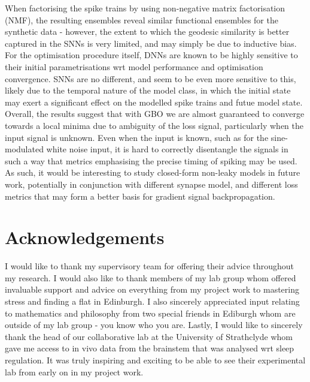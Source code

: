 \documentclass[mphil,deptreport,ai]{infthesis} %
\begin{document}
\begin{preliminary}
{    When factorising the spike trains by using non-negative matrix factorisation (NMF), the resulting ensembles reveal similar functional ensembles for the synthetic data - however, the extent to which the geodesic similarity is better captured in the SNNs is very limited, and may simply be due to inductive bias.
    For the optimisation procedure itself, DNNs are known to be highly sensitive to their initial parametrisations wrt model performance and optimisation convergence.
    SNNs are no different, and seem to be even more sensitive to this, likely due to the temporal nature of the model class, in which the initial state may exert a significant effect on the modelled spike trains and futue model state.
    Overall, the results suggest that with GBO we are almost guaranteed to converge towards a local minima due to ambiguity of the loss signal, particularly when the input signal is unknown.
    Even when the input is known, such as for the sine-modulated white noise input, it is hard to correctly disentangle the signals in such a way that metrics emphasising the precise timing of spiking may be used.
    As such, it would be interesting to study closed-form non-leaky models in future work, potentially in conjunction with different synapse model, and different loss metrics that may form a better basis for gradient signal backpropagation.
}

\maketitle

\section*{Acknowledgements}

I would like to thank my supervisory team for offering their advice throughout my research.
I would also like to thank members of my lab group whom offered invaluable support and advice on everything from my project work to mastering stress and finding a flat in Edinburgh.
I also sincerely appreciated input relating to mathematics and philosophy from two special friends in Ediburgh whom are outside of my lab group - you know who you are.
Lastly, I would like to sincerely thank the head of our collaborative lab at the University of Strathclyde whom gave me access to in vivo data from the brainstem that was analysed wrt sleep regulation. It was truly inspiring and exciting to be able to see their experimental lab from early on in my project work.


\tableofcontents
\end{preliminary}
\end{document}
